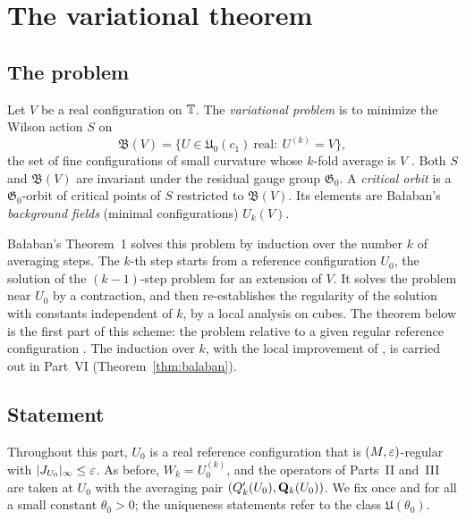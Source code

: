\section{The variational theorem}\label{sec:var-theorem}

\subsection{The problem}

Let $V$ be a real configuration on $\mathbb T$. The \emph{variational problem} is to minimize the Wilson action $S$ on
\[
\mathfrak B(V)=\{U\in\mathfrak U_0(c_1)\ \text{real}:\ U^{(k)}=V\},
\]
the set of fine configurations of small curvature whose $k$-fold average is $V$ \cite[(3), (5), (6)]{BalVar}. Both $S$ and $\mathfrak B(V)$ are invariant under the residual gauge group $\mathfrak G_0$. A \emph{critical orbit} is a $\mathfrak G_0$-orbit of critical points of $S$ restricted to $\mathfrak B(V)$. Its elements are Ba\l aban's \emph{background fields} (minimal configurations) $U_k(V)$.

Ba\l aban's Theorem~1 \cite{BalVar} solves this problem by induction over the number $k$ of averaging steps. The $k$-th step starts from a reference configuration $U_0$, the solution of the $(k-1)$-step problem for an extension of $V$. It solves the problem near $U_0$ by a contraction, and then re-establishes the regularity of the solution with constants independent of $k$, by a local analysis on cubes. The theorem below is the first part of this scheme: the problem relative to a given regular reference configuration \cite[Sects.~A--E, G]{BalVar}. The induction over $k$, with the local improvement of \cite[Sect.~F]{BalVar}, is carried out in Part~VI (Theorem~\ref{thm:balaban}).

\subsection{Statement}

Throughout this part, $U_0$ is a real reference configuration that is $(M,\varepsilon)$-regular with $|J_{U_0}|_\infty\le\varepsilon$. As before, $W_k=U_0^{(k)}$, and the operators of Parts~II and~III are taken at $U_0$ with the averaging pair $(Q'_k(U_0),\mathbf Q_k(U_0))$. We fix once and for all a small constant $\theta_0>0$; the uniqueness statements refer to the class $\mathfrak U(\theta_0)$.

